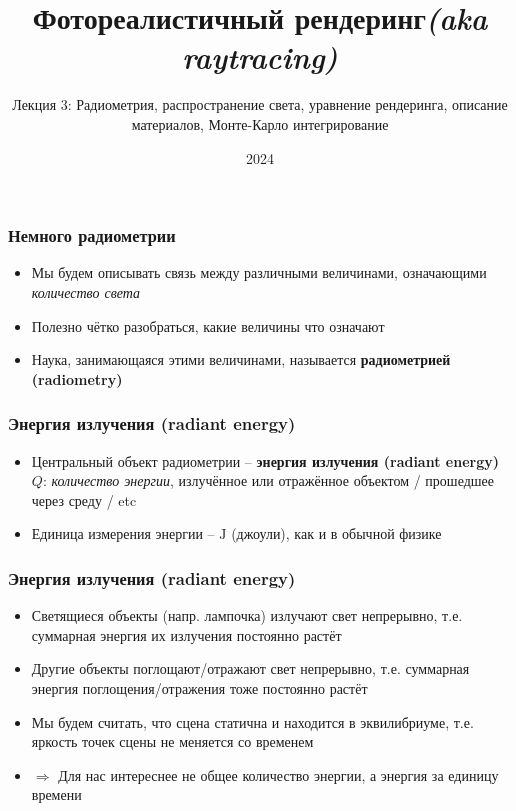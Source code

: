 \documentclass[handout,10pt]{beamer}
\title{Фотореалистичный рендеринг\quad\quad\quad\quad\quad\quad \textit{(aka raytracing)}}
\subtitle{Лекция 3: Радиометрия, распространение света, уравнение рендеринга, описание материалов, Монте-Карло интегрирование}
\date{2024}
\begin{document}
\frame{\titlepage}

\begin{frame}
\frametitle{Немного радиометрии}
\begin{itemize}
\item Мы будем описывать связь между различными величинами, означающими \textit{количество света}
\pause
\item Полезно чётко разобраться, какие величины что означают
\pause
\item Наука, занимающаяся этими величинами, называется \textbf{радиометрией (radiometry)} 
\end{itemize}
\end{frame}

\begin{frame}
\frametitle{Энергия излучения (radiant energy)}
\begin{itemize}
\item Центральный объект радиометрии -- \textbf{энергия излучения (radiant energy)} \begin{math}Q\end{math}: \textit{количество энергии}, излучённое или отражённое объектом / прошедшее через среду / etc
\pause
\item Единица измерения энергии -- \begin{math}\text{J}\end{math} (джоули), как и в обычной физике
\end{itemize}
\end{frame}

\begin{frame}
\frametitle{Энергия излучения (radiant energy)}
\begin{itemize}
\item Светящиеся объекты (напр. лампочка) излучают свет непрерывно, т.е. суммарная энергия их излучения постоянно растёт
\pause
\item Другие объекты поглощают/отражают свет непрерывно, т.е. суммарная энергия поглощения/отражения тоже постоянно растёт
\pause
\item Мы будем считать, что сцена статична и находится в эквилибриуме, т.е. яркость точек сцены не меняется со временем
\pause
\item \begin{math}\Longrightarrow\end{math} Для нас интереснее не общее количество энергии, а энергия за единицу времени
\end{itemize}
\end{frame}
\end{document}
